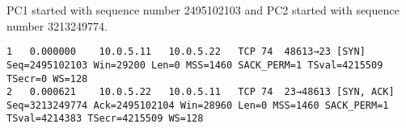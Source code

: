PC1 started with sequence number 2495102103 and PC2 started with sequence number 3213249774.

\begin{lstlisting}
1	0.000000	10.0.5.11	10.0.5.22	TCP	74	48613→23 [SYN] Seq=2495102103 Win=29200 Len=0 MSS=1460 SACK_PERM=1 TSval=4215509 TSecr=0 WS=128
2	0.000621	10.0.5.22	10.0.5.11	TCP	74	23→48613 [SYN, ACK] Seq=3213249774 Ack=2495102104 Win=28960 Len=0 MSS=1460 SACK_PERM=1 TSval=4214383 TSecr=4215509 WS=128
\end{lstlisting}